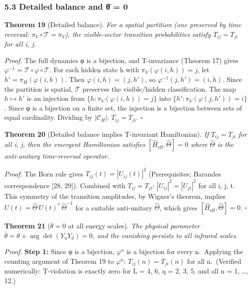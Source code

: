 \documentclass[
]{article}
\begin{document}
\hypertarget{detailed-balance-and-ux3b8-0}{%
\subsubsection{5.3 Detailed balance and θ̄ =
0}\label{detailed-balance-and-ux3b8-0}}

\textbf{Theorem 19} (Detailed balance). \emph{For a spatial partition
(one preserved by time reversal: \(\pi_V \circ \mathcal{T} = \pi_V\)),
the visible-sector transition probabilities satisfy \(T_{ij} = T_{ji}\)
for all i, j.}

\emph{Proof.} The full dynamics φ is a bijection, and T-invariance
(Theorem 17) gives
\(\varphi^{-1} = \mathcal{T} \circ \varphi \circ \mathcal{T}\). For each
hidden state h with \(\pi_V(\varphi(i, h)) = j\), let
\(h' = \pi_H(\varphi(i, h))\). Then \(\varphi(i, h) = (j, h')\), so
\(\varphi^{-1}(j, h') = (i, h)\). Since the partition is spatial,
\(\mathcal{T}\) preserves the visible/hidden classification. The map
\(h \mapsto h'\) is an injection from
\(\{h : \pi_V(\varphi(i,h)) = j\}\) into
\(\{h' : \pi_V(\varphi(j,h')) = i\}\). Since φ is a bijection on a
finite set, the injection is a bijection between sets of equal
cardinality. Dividing by \(|\mathcal{C}_H|\): \(T_{ij} = T_{ji}\).
\(\square\)

\textbf{Theorem 20} (Detailed balance implies T-invariant Hamiltonian).
\emph{If \(T_{ij} = T_{ji}\) for all i, j, then the emergent Hamiltonian
satisfies \([\hat{H}_{\text{eff}}, \hat{\Theta}] = 0\) where
\(\hat{\Theta}\) is the anti-unitary time-reversal operator.}

\emph{Proof.} The Born rule gives \(T_{ij}(t) = |U_{ij}(t)|^2\)
(Prerequisites; Barandes correspondence {[}28, 29{]}). Combined with
\(T_{ij} = T_{ji}\): \(|U_{ij}|^2 = |U_{ji}|^2\) for all i, j, t. This
symmetry of the transition amplitudes, by Wigner's theorem, implies
\(U(t) = \hat{\Theta}\,U(t)^*\,\hat{\Theta}^{-1}\) for a suitable
anti-unitary \(\hat{\Theta}\), which gives
\([\hat{H}_{\text{eff}}, \hat{\Theta}] = 0\). \(\square\)

\textbf{Theorem 21} (\(\bar{\theta} = 0\) at all energy scales).
\emph{The physical parameter
\(\bar{\theta} = \theta + \arg\det(Y_u Y_d) = 0\), and the vanishing
persists to all infrared scales.}

\emph{Proof.} \textbf{Step 1:} Since φ is a bijection, \(\varphi^n\) is
a bijection for every n.~Applying the counting argument of Theorem 19 to
\(\varphi^n\): \(T_{ij}(n) = T_{ji}(n)\) for all n.~(Verified
numerically: T-violation is exactly zero for L = 4, 6, q = 2, 3, 5, and
all n = 1, \ldots, 12.)
\end{document}
